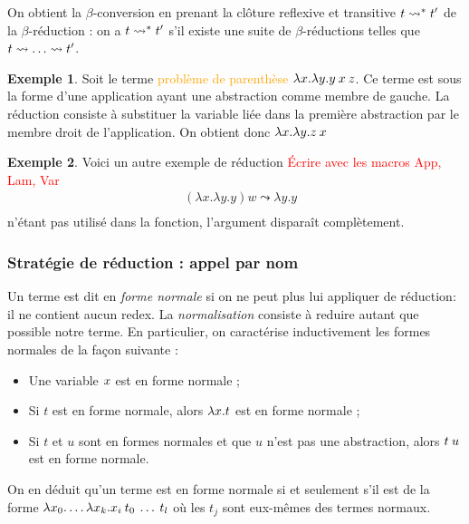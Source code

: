 \documentclass {article}
\theoremstyle{definition}
\newtheorem{example}{Exemple}
\theoremstyle{remark}
\newcommand{\todo}[1]{\textcolor{red}{#1}}
\newcommand{\attention}[1]{\textcolor{orange}{#1}}
\begin{document}
On obtient la \(\beta\)-conversion en prenant la clôture reflexive et
transitive \(t \leadsto^{*} t'\) de la \(\beta\)-réduction : on a \(t \leadsto^{*}
t'\) s'il existe une suite de \(\beta\)-réductions telles que \(t \leadsto
\ldots \leadsto t'\).

\begin{example}
  Soit le terme \attention{problème de parenthèse} \(\lambda x. \lambda y. y\:x\:z\).  Ce terme est
  sous la forme d'une application ayant une abstraction comme membre
  de gauche. La réduction consiste à substituer la variable liée dans
  la première abstraction par le membre droit de l'application. On obtient donc 
   \(\lambda x. \lambda y. z\:x\)
\end{example}

\begin{example}
  Voici un autre exemple de réduction
  \todo{Écrire avec les macros App, Lam, Var}
  \begin{align*}
    & (\lambda x .\lambda y. y) w \leadsto \lambda y.y \\
  \end{align*}
   n'étant pas utilisé dans la fonction, l'argument  disparaît complètement.
\end{example}


\subsubsection{Stratégie de réduction : appel par nom}

\label{reduction:call_by_name}
Un terme est dit en \emph{forme
  normale} si on ne peut plus lui
appliquer de réduction: il ne contient aucun redex. La \emph{normalisation}
consiste à reduire autant que possible notre terme. En
particulier, on caractérise inductivement les formes normales de la
façon suivante :
%
\begin{itemize}
\item Une variable \(x\) est en forme normale ;
\item Si \(t\) est en forme normale, alors \(\lambda x. t\) est en
  forme normale ;
\item Si \(t\) et \(u\) sont en formes normales et que \(u\) n'est pas
  une abstraction, alors \(t\:u\) est en forme normale.
\end{itemize}

On en déduit qu'un terme est en forme normale si et seulement s'il est
de la forme
\(\lambda x_0. \ldots\lambda x_k. x_i\:t_0\:\ldots\:t_l\)
où les \(t_j\) sont eux-mêmes des termes normaux.
\end{document}
